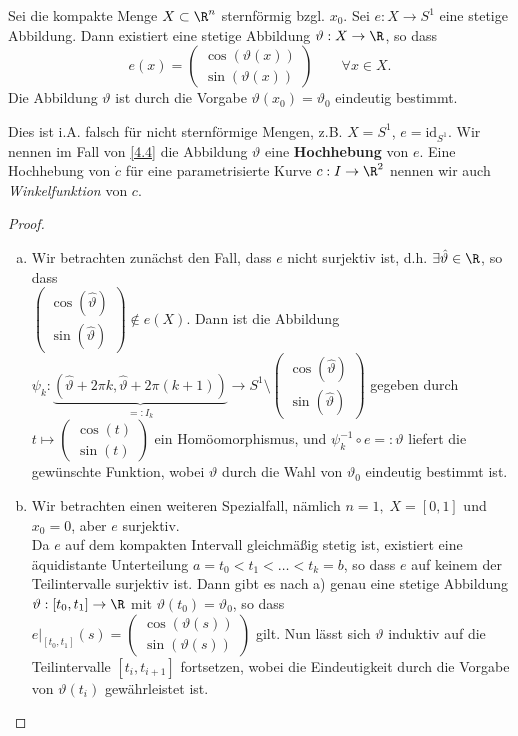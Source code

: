 \documentclass{mycourse}
\newcommand{\tta}{\vartheta}
\begin{document}
\begin{lem}[Hochhebungslemma]
\label{4.4}
Sei die kompakte Menge $X \subset \R^n$ sternförmig bzgl. $x_0$. Sei $e : X \to S^1$ eine stetige Abbildung. Dann existiert eine stetige Abbildung $\vartheta: X \to \R$, so dass 
\[ e(x) = \begin{pmatrix} \cos (\vartheta(x)) \\ \sin(\vartheta(x)) \end{pmatrix} \qquad \forall x \in X. \]
Die Abbildung $\vartheta$ ist durch die Vorgabe $\vartheta(x_0) = \vartheta_0$ eindeutig bestimmt.
\begin{note}
Dies ist i.A. falsch für nicht sternförmige Mengen, z.B. $X = S^1$, $e = \text{id}_{S^1}$. Wir nennen im Fall von \ref{4.4} die Abbildung $\tta$ eine \textbf{Hochhebung} von $e$. Eine Hochhebung von $\dot c$ für eine parametrisierte Kurve $c: I \to \R^2$ nennen wir auch \emph{Winkelfunktion} von $c$.
\end{note}
\begin{proof}
\begin{enumerate}[a)]
	\item 
Wir betrachten zunächst den Fall, dass $e$ nicht surjektiv ist, d.h. $\exists \hat \tta \in \R$, so dass \\  $\begin{pmatrix} \cos(\hat \tta) \\ \sin(\hat \tta) \end{pmatrix} \notin e(X) $. Dann ist die Abbildung $\psi_k: \underbrace{(\hat \tta + 2\pi k, \hat \tta + 2 \pi (k+1))}_{=: I_k} \to S^1 \setminus \begin{pmatrix} \cos(\hat \tta) \\ \sin(\hat \tta) \end{pmatrix} $ gegeben durch $t \mapsto \begin{pmatrix} \cos(t) \\ \sin(t) \end{pmatrix}$ ein Homöomorphismus, und $\psi_k^{-1} \circ e =: \tta$ liefert die gewünschte Funktion, wobei $\tta$ durch die Wahl von $\tta_0$ eindeutig bestimmt ist.

	\item 
Wir betrachten einen weiteren Spezialfall, nämlich $n = 1, \; X = [0,1]$ und $x_0 = 0$, aber $e$ surjektiv. \\
Da $e$ auf dem kompakten Intervall gleichmäßig stetig ist, existiert eine äquidistante Unterteilung $a = t_0 < t_1 < \dots < t_k = b$, so dass $e$ auf keinem der Teilintervalle surjektiv ist. Dann gibt es nach a) genau eine stetige Abbildung $\tta: [t_0, t_1] \to \R$ mit $\tta(t_0) = \tta_0$, so dass \\ $e\big |_{[t_0, t_1]}(s) = \begin{pmatrix} \cos(\tta(s)) \\ \sin(\tta(s)) \end{pmatrix}$ gilt. Nun lässt sich $\tta$ induktiv auf die Teilintervalle $[t_i, t_{i+1}]$ fortsetzen, wobei die Eindeutigkeit durch die Vorgabe von $\tta(t_i)$ gewährleistet ist.


\end{enumerate}
\end{proof}
\end{lem}
\end{document}
